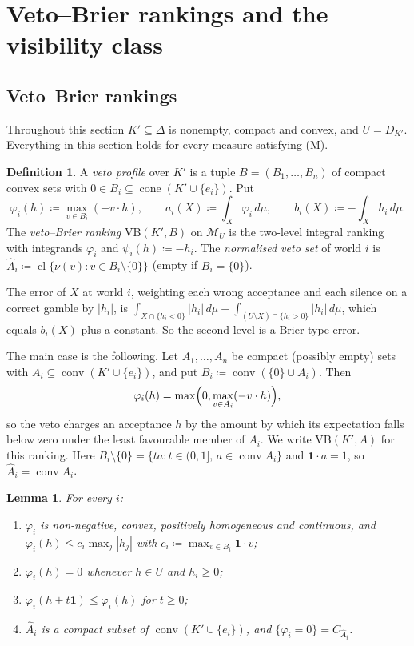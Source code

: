 \documentclass[11pt]{article}
\newcommand{\one}{\mathbf{1}}
\newcommand{\M}{\mathcal{M}}
\newcommand{\VB}{\mathrm{VB}}
\DeclareMathOperator{\conv}{conv}
\DeclareMathOperator{\cone}{cone}
\DeclareMathOperator{\cl}{cl}
\theoremstyle{plain}
\newtheorem{lemma}[theorem]{Lemma}
\theoremstyle{definition}
\newtheorem{definition}[theorem]{Definition}
\theoremstyle{remark}
\begin{document}
\section{Veto--Brier rankings and the visibility class}\label{sec:vb}

\subsection{Veto--Brier rankings}

Throughout this section $K'\subseteq\Delta$ is nonempty, compact and convex, and
$U=D_{K'}$. Everything in this section holds for every measure satisfying (M).

\begin{definition}\label{def:vb}
A \emph{veto profile} over $K'$ is a tuple $B=(B_1,\dots,B_n)$ of compact convex sets
with $0\in B_i\subseteq\cone(K'\cup\{e_i\})$. Put
\[
  \varphi_i(h)\coloneqq\max_{v\in B_i}(-v\cdot h),\qquad
  a_i(X)\coloneqq\int_X\varphi_i\,d\mu,\qquad
  b_i(X)\coloneqq-\int_Xh_i\,d\mu .
\]
The \emph{veto--Brier ranking} $\VB(K',B)$ on $\M_U$ is the two-level integral ranking
with integrands $\varphi_i$ and $\psi_i(h)\coloneqq-h_i$. The \emph{normalised veto set} of
world $i$ is $\hat A_i\coloneqq\cl\{\nu(v):v\in B_i\setminus\{0\}\}$ (empty if
$B_i=\{0\}$).
\end{definition}

The error of $X$ at world $i$, weighting each wrong acceptance and each silence on a
correct gamble by $|h_i|$, is $\int_{X\cap\{h_i<0\}}|h_i|\,d\mu+\int_{(U\setminus X)
\cap\{h_i>0\}}|h_i|\,d\mu$, which equals $b_i(X)$ plus a constant. So the second level is a
Brier-type error.

The main case is the following. Let $A_1,\dots,A_n$ be compact (possibly empty) sets with
$A_i\subseteq\conv(K'\cup\{e_i\})$, and put $B_i\coloneqq\conv(\{0\}\cup A_i)$. Then
\[
  \varphi_i(h)=\max\Bigl(0,\max_{v\in A_i}(-v\cdot h)\Bigr),
\]
so the veto charges an acceptance $h$ by the amount by which its expectation falls below
zero under the least favourable member of $A_i$. We write $\VB(K',A)$ for this ranking.
Here $B_i\setminus\{0\}=\{ta:t\in(0,1],\,a\in\conv A_i\}$ and $\one\cdot a=1$, so
$\hat A_i=\conv A_i$.

\begin{lemma}\label{lem:veto}
For every $i$:
\begin{enumerate}[label=(\alph*)]
  \item $\varphi_i$ is non-negative, convex, positively homogeneous and continuous, and
  $\varphi_i(h)\le c_i\max_j|h_j|$ with $c_i\coloneqq\max_{v\in B_i}\one\cdot v$;
  \item $\varphi_i(h)=0$ whenever $h\in U$ and $h_i\ge0$;
  \item $\varphi_i(h+t\one)\le\varphi_i(h)$ for $t\ge0$;
  \item $\hat A_i$ is a compact subset of $\conv(K'\cup\{e_i\})$, and
  $\{\varphi_i=0\}=C_{\hat A_i}$.
\end{enumerate}
\end{lemma}
\end{document}
